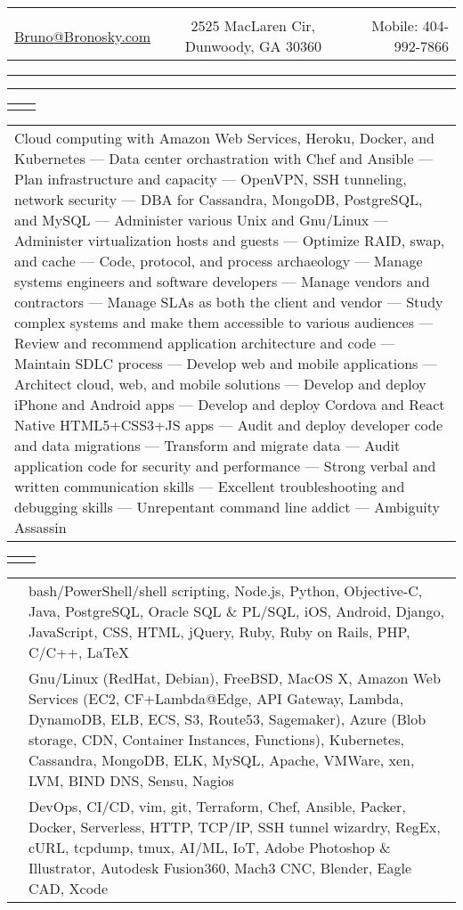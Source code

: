 \documentclass[letterpaper,10pt]{article}
\newcommand{\lineDouble}[0]{\hrule\vspace{2pt}\hrule\vspace{1.5pt}}
\newcommand{\sizeE}[0]{\fontsize{10pt}{12pt}\selectfont}
\newcommand{\sizeF}[0]{\fontsize{11pt}{13pt}\selectfont}
\newcommand{\heading}[4]{
    \begin{tabularx}{\textwidth}{LCR}
        &\huge{\textbf{\sc{#1}}}&\\
        \href{mailto:#2}{#2} & #3 & Mobile: #4\\
    \end{tabularx}
    \lineDouble
    \vspace{5pt}%
}
\newcounter{skipfirstcounter}
\newcommand{\blocktitle}[1]{
    \setcounter{skipfirstcounter}{0}
    \begin{tabularx}{\textwidth}{lR}
        {\sizeF\sc{#1}} & \noindent\hrulefill\\
    \end{tabularx}
}
\newcommand{\blockOverview}[1]{%
    \blocktitle{Overview}%
    \vspace{0.4mm}%
    \begin{tabular*}{\textwidth}{p{\textwidth}}%
        #1%
    \end{tabular*}%
    \vspace{2mm}%
}%
\newcommand{\blockSkills}[1]{
    \blocktitle{Skills}
    \begin{tabular*}{\textwidth}{p{22mm}p{171.6mm}}%
        #1%
    \end{tabular*}%
    \vspace{2.4mm}%
}
\newcommand{\skillgroup}[2]{{\sizeE{#1}} & #2\\\addlinespace[1.6mm]}
\newcommand{\skillgrouplast}[2]{{\sizeE{#1}} & #2\\}
\begin{document}
\heading{Bruno Bronosky}
{Bruno@Bronosky.com}
{2525 MacLaren Cir, Dunwoody, GA 30360}
{404-992-7866}

\blockOverview{
    Cloud computing with Amazon Web Services, Heroku, Docker, and Kubernetes ---
    Data center orchastration with Chef and Ansible ---
    Plan infrastructure and capacity ---
    OpenVPN, SSH tunneling, network security ---
    DBA for Cassandra, MongoDB, PostgreSQL, and MySQL ---
    Administer various Unix and Gnu/Linux ---
    Administer virtualization hosts and guests ---
    Optimize RAID, swap, and cache ---
    Code, protocol, and process archaeology ---
    Manage systems engineers and software developers ---
    Manage vendors and contractors ---
    Manage SLAs as both the client and vendor ---
    Study complex systems and make them accessible to various audiences ---
    Review and recommend application architecture and code ---
    Maintain SDLC process ---
    Develop web and mobile applications ---
    Architect cloud, web, and mobile solutions ---
    Develop and deploy iPhone and Android apps ---
    Develop and deploy Cordova and React Native HTML5+CSS3+JS apps ---
    Audit and deploy developer code and data migrations ---
    Transform and migrate data ---
    Audit application code for security and performance ---
    Strong verbal and written communication skills ---
    Excellent troubleshooting and debugging skills ---
    Unrepentant command line addict ---
    Ambiguity Assassin
}

\blockSkills{
    \skillgroup{Development}{
        bash/PowerShell/shell scripting,
        Node.js,
        Python,
        Objective-C,
        Java,
        PostgreSQL,
        Oracle SQL \& PL/SQL,
        iOS,
        Android,
        Django,
        JavaScript,
        CSS,
        HTML,
        jQuery,
        Ruby,
        Ruby on Rails,
        PHP,
        C/C++,
        \LaTeX
    }

    \skillgroup{Operations}{
        Gnu/Linux (RedHat, Debian),
        FreeBSD,
        MacOS X,
        Amazon Web Services (EC2, CF+Lambda@Edge, API Gateway, Lambda, DynamoDB, ELB, ECS, S3, Route53, Sagemaker),
        Azure (Blob storage, CDN, Container Instances, Functions),
        Kubernetes,
        Cassandra,
        MongoDB,
        ELK,
        MySQL,
        Apache,
        VMWare,
        xen,
        LVM,
        BIND DNS,
        Sensu,
        Nagios
    }

    \skillgrouplast{Concepts}{
        DevOps,
        CI/CD,
        vim,
        git,
        Terraform,
        Chef,
        Ansible,
        Packer,
        Docker,
        Serverless,
        HTTP,
        TCP/IP,
        SSH tunnel wizardry,
        RegEx,
        cURL,
        tcpdump,
        tmux,
        AI/ML,
        IoT,
        Adobe Photoshop \& Illustrator,
        Autodesk Fusion360,
        Mach3 CNC,
        Blender,
        Eagle CAD,
        Xcode
    }
}
\end{document}
